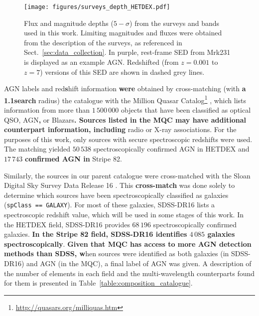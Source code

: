 \documentclass{aa}
\begin{document}
\begin{figure}
   \centering
   \texttt{[image: figures/surveys\_depth\_HETDEX.pdf]}
   \caption{Flux and magnitude depths ($5{-}\sigma$) from the surveys and bands used in this work. Limiting magnitudes and fluxes were obtained from the description of the surveys, as referenced in Sect.~\ref{sec:data_collection}. In purple, rest-frame SED from Mrk231 \citep[$z = 0.0422$,][]{2019MNRAS.489.3351B} is displayed as an example AGN. Redshifted (from $z {=} 0.001$ to $z {=} 7$) versions of this SED are shown in dashed grey lines.}
   \label{fig:surveys_depth_HETDEX}
\end{figure}

AGN labels and red\textbf{s}hift information \textbf{were} obtained by cross-matching (with \textbf{a} \textbf{1.1}\arcsec \textbf{search} radius) the catalogue with the Million Quasar Catalog\footnote{\url{http://quasars.org/milliquas.htm}} \citep[MQC, v7.4d;][]{2021arXiv210512985F}, which lists information from more than \textbf{$1\,500\,000$} objects that have been classified as optical QSO, AGN\textbf{,} or Blazars\textbf{. Sources listed in the MQC may have additional counterpart information, including} radio or X-ray associations. For the purposes of this work, only sources with secure spectroscopic redshifts were used. The matching yielded $50\,538$ spectroscopically confirmed AGN in HETDEX and $17\,743$ \textbf{confirmed AGN in} Stripe 82.

Similarly, the sources in our parent catalogue were cross-matched with the Sloan Digital Sky Survey Data Release 16 \citep[SDSS-DR16;][]{2020ApJS..249....3A}. This \textbf{cross-match} was done solely to determine which sources have been spectroscopically classified as galaxies (\verb|spClass == GALAXY|). 
For most of these galaxies, SDSS-DR16 lists a spectroscopic redshift value, which will be used in some stages of this work. In the HETDEX field, SDSS-DR16 provides $68\,196$ spectroscopically confirmed galaxies. \textbf{In the Stripe 82 field, SDSS-DR16 identifies $4\,085$ galaxies spectroscopically}. \textbf{Given that MQC has access to more AGN detection methods than SDSS, w}hen sources were identified as both galaxies (in SDSS-DR16) and AGN (in the MQC), a final label of AGN was given. 
A description of the number of elements in each field and the multi-wavelength counterparts found for them is presented in Table~\ref{table:composition_catalogue}.
\end{document}
